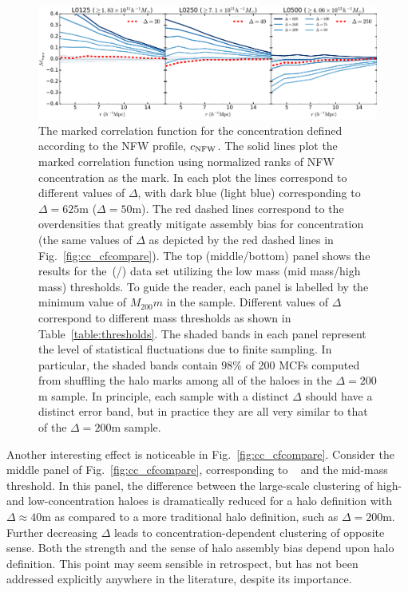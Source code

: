 \documentclass[usenatbib,fleqn]{mnras}
\begin{document}
\begin{figure}
	\centering
	\includegraphics[width=\textwidth]{all_mcf_cNFW.pdf}
	\caption{
The marked correlation function for the concentration defined according to the NFW profile, $c_{\rm NFW}$. The solid lines plot the marked correlation function using normalized ranks of NFW concentration as the mark. In each plot the lines correspond to different values of $\Delta$, with dark blue (light blue) corresponding to $\Delta = 625$m ($\Delta = 50$m). The red dashed lines correspond to the overdensities that greatly mitigate assembly bias for concentration (the same values of $\Delta$ as depicted by the red dashed lines in Fig.~\ref{fig:cc_cfcompare}). The top (middle/bottom) panel shows the results for the\simA \ (\simB /\simC) data set utilizing the low mass (mid mass/high mass) thresholds. To guide the reader, each panel is labelled by the minimum value of $M_{200}m$ in the sample. Different values of $\Delta$ correspond to different mass thresholds as shown in Table~\ref{table:thresholds}. The shaded bands in each panel represent the level of statistical fluctuations due to finite sampling. In particular, the shaded bands contain $98\%$ of 200 MCFs computed from shuffling the halo marks among all of the haloes in the $\Delta=200$m sample. In principle, each sample with a distinct $\Delta$ should have a distinct error band, but in practice they are all very similar to that of the $\Delta=200$m sample.
}
\label{fig:cc_mcf_cnfw}
\end{figure}

Another interesting effect is noticeable in Fig.~\ref{fig:cc_cfcompare}. Consider the middle panel of Fig.~\ref{fig:cc_cfcompare}, corresponding to \simB~ and the mid-mass threshold. In this panel, the difference between the large-scale clustering of high- and low-concentration haloes is dramatically reduced for a halo definition with $\Delta \approx 40$m as compared to a more traditional halo definition, such as $\Delta=200$m. 
Further decreasing $\Delta$ leads to concentration-dependent clustering of opposite sense. Both the strength and the sense of halo assembly bias depend upon halo definition. This point may seem sensible in retrospect, but has not been addressed explicitly anywhere in the literature, despite its importance.
\end{document}
